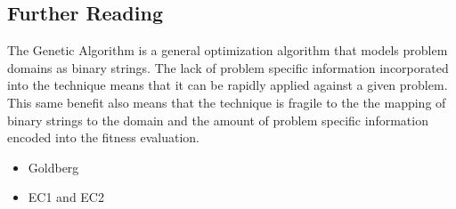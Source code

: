 \subsection{Further Reading}
The Genetic Algorithm is a general optimization algorithm that models problem domains as binary strings. The lack of problem specific information incorporated into the technique means that it can be rapidly applied against a given problem. This same benefit also means that the technique is fragile to the the mapping of binary strings to the domain and the amount of problem specific information encoded into the fitness evaluation. 

\begin{itemize}
	\item Goldberg
	\item EC1 and EC2
\end{itemize}